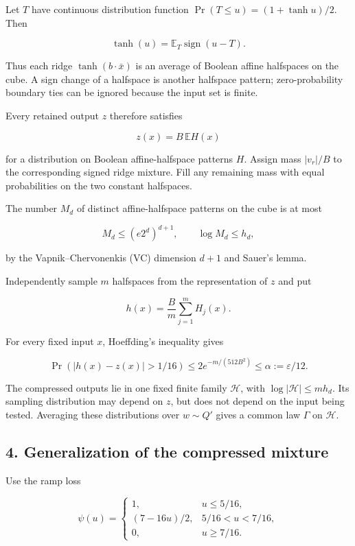 \documentclass[11pt]{article}
\begin{document}
Let \(T\) have continuous distribution function
\(\Pr(T\le u)=(1+\tanh u)/2\). Then

\[
\tanh(u)=\mathbb E_T\operatorname{sign}(u-T).
\]

Thus each ridge \(\tanh(b\cdot\bar x)\) is an average of Boolean affine
halfspaces on the cube. A sign change of a halfspace is another
halfspace pattern; zero-probability boundary ties can be ignored because
the input set is finite.

Every retained output \(z\) therefore satisfies

\[
z(x)=B\,\mathbb E H(x)
\]

for a distribution on Boolean affine-halfspace patterns \(H\). Assign
mass \(|v_r|/B\) to the corresponding signed ridge mixture. Fill any
remaining mass with equal probabilities on the two constant halfspaces.

The number \(M_d\) of distinct affine-halfspace patterns on the cube is
at most

\[
M_d\le(e2^d)^{d+1},\qquad\log M_d\le h_d,
\]

by the Vapnik--Chervonenkis (VC) dimension \(d+1\) and Sauer's lemma.

Independently sample \(m\) halfspaces from the representation of \(z\)
and put

\[
h(x)=\frac Bm\sum_{j=1}^m H_j(x).
\]

For every fixed input \(x\), Hoeffding's inequality gives

\[
\Pr(|h(x)-z(x)|>1/16)
\le2e^{-m/(512B^2)}\le\alpha:=\varepsilon/12.
\]

The compressed outputs lie in one fixed finite family \(\mathcal H\),
with \(\log|\mathcal H|\le m h_d\). Its sampling distribution may depend
on \(z\), but does not depend on the input being tested. Averaging these
distributions over \(w\sim Q'\) gives a common law \(\Gamma\) on
\(\mathcal H\).

\subsection{4. Generalization of the compressed
mixture}\label{generalization-of-the-compressed-mixture}

Use the ramp loss

\[
\psi(u)=\begin{cases}
1,&u\le5/16,\\
(7-16u)/2,&5/16<u<7/16,\\
0,&u\ge7/16.
\end{cases}
\]
\end{document}
